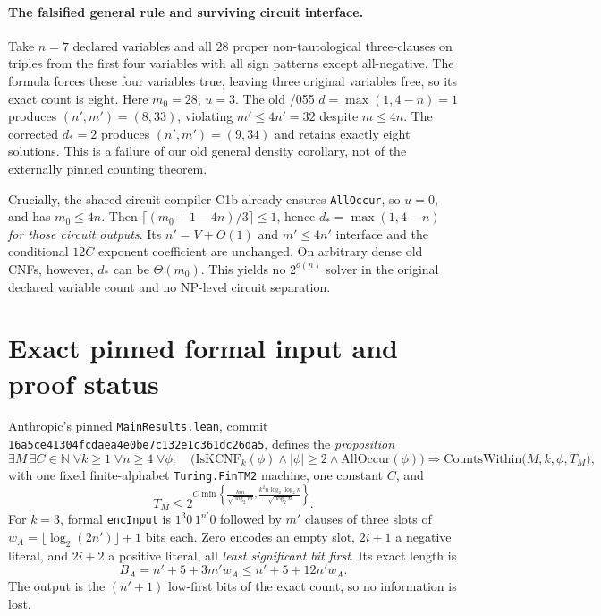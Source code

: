 \documentclass[11pt]{article}
\begin{document}
\paragraph{The falsified general rule and surviving circuit interface.}
Take $n=7$ declared variables and all $28$ proper non-tautological
three-clauses on triples from the first four variables with all
sign patterns except all-negative. The formula forces these four
variables true, leaving three original variables free, so its exact
count is eight. Here $m_0=28$, $u=3$. The old /055
$d=\max(1,4-n)=1$ produces $(n',m')=(8,33)$, violating
$m'\le4n'=32$ despite $m\le4n$. The corrected $d_*=2$
produces $(n',m')=(9,34)$ and retains exactly eight solutions.
This is a failure of our old general density corollary,
not of the externally pinned counting theorem.

Crucially, the shared-circuit compiler C1b already ensures
\texttt{AllOccur}, so $u=0$, and has $m_0\le4n$.
Then $\lceil(m_0+1-4n)/3\rceil\le1$, hence
$d_*=\max(1,4-n)$ \emph{for those circuit outputs}.
Its $n'=V+O(1)$ and $m'\le4n'$ interface and the conditional
$12C$ exponent coefficient are unchanged. On arbitrary dense
old CNFs, however, $d_*$ can be $\Theta(m_0)$.
This yields no $2^{o(n)}$ solver in the original declared
variable count and no NP-level circuit separation.

\section{Exact pinned formal input and proof status}
Anthropic's pinned \texttt{MainResults.lean}, commit
\texttt{16a5ce41304fcdaea4e0be7c132e1c361dc26da5}, defines the \emph{proposition}
\[
\exists M\,\exists C\in\mathbb N\;\forall k\ge1\;\forall n\ge4\;
\forall\phi:\quad
\bigl(\mathrm{IsKCNF}_k(\phi)\land |\phi|\ge2
\land\mathrm{AllOccur}(\phi)\bigr)\Rightarrow
\mathrm{CountsWithin}\bigl(M,k,\phi,T_M\bigr),
\]
with one fixed finite-alphabet \texttt{Turing.FinTM2} machine, one constant $C$, and
\[
T_M\le2^{C\min\left\{
 \frac{km}{\sqrt{\log_2 m}},
 \frac{k^2n\log_2\log_2n}{\sqrt{\log_2n}}
\right\}}.
\]
For $k=3$, formal \texttt{encInput} is $1^3 0\,1^{n'}0$ followed by $m'$ clauses of three slots of
$w_A=\lfloor\log_2(2n')\rfloor+1$ bits each. Zero encodes an empty slot, $2i+1$ a negative literal, and $2i+2$ a positive literal, all \emph{least significant bit first}. Its exact length is
\[
B_A=n'+5+3m'w_A\le n'+5+12n'w_A.
\]
The output is the $(n'+1)$ low-first bits of the exact count, so no information is lost.
\end{document}

